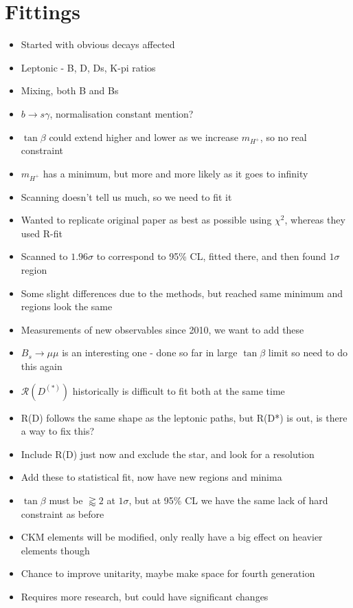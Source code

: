 \documentclass[12pt,a5paper]{article}
\begin{document}
\section{Fittings}
\begin{itemize}
    \item Started with obvious decays affected 
    \item Leptonic - B, D, Ds, K-pi ratios
    \item Mixing, both B and Bs
    \item $b\to s\gamma$, normalisation constant mention?
    \item $\tan\beta$ could extend higher and lower as we increase $m_{H^+}$, so no real constraint
    \item $m_{H^+}$ has a minimum, but more and more likely as it goes to infinity
    \item Scanning doesn't tell us much, so we need to fit it
    \item Wanted to replicate original paper as best as possible using $\chi^2$, whereas they used R-fit
    \item Scanned to $1.96\sigma$ to correspond to 95\% CL, fitted there, and then found $1\sigma$ region
    \item Some slight differences due to the methods, but reached same minimum and regions look the same
    \item Measurements of new observables since 2010, we want to add these
    \item $B_s\to\mu\mu$ is an interesting one - done so far in large $\tan\beta$ limit so need to do this again
    \item $\mathcal{R}(D^{(*)})$ historically is difficult to fit both at the same time
    \item R(D) follows the same shape as the leptonic paths, but R(D*) is out, is there a way to fix this?
    \item Include R(D) just now and exclude the star, and look for a resolution
    \item Add these to statistical fit, now have new regions and minima
    \item $\tan\beta$ must be $\gtrapprox2$ at $1\sigma$, but at 95\% CL we have the same lack of hard constraint as before
    \item CKM elements will be modified, only really have a big effect on heavier elements though
    \item Chance to improve unitarity, maybe make space for fourth generation
    \item Requires more research, but could have significant changes
\end{itemize}
\end{document}

